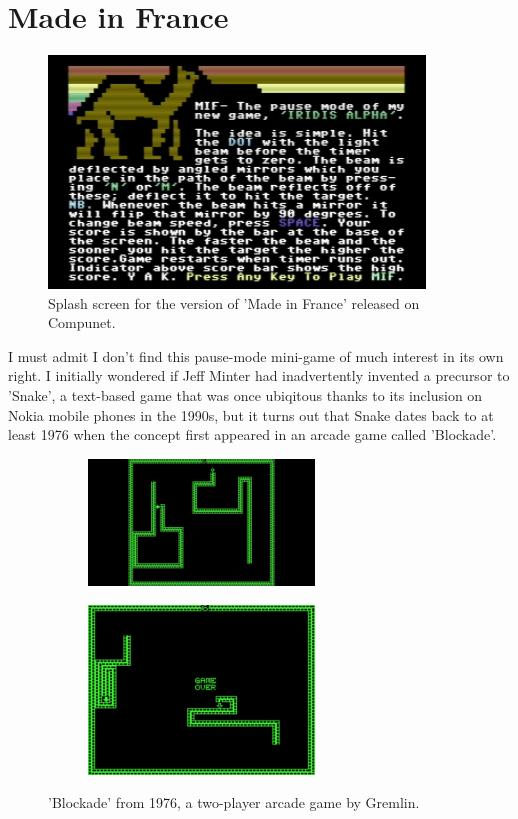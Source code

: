 \chapter{Made in France} 
\label{sec:mif}
\lstset{style=6502Style}
\begin{figure}[H]
    \centering
      \includegraphics[width=10cm]{src/mif/mif.png}%
\caption{Splash screen for the version of 'Made in France' released on Compunet.}
\end{figure}

I must admit I don't find this pause-mode mini-game of much interest in its own right. I initially
wondered if Jeff Minter had inadvertently invented a precursor to 'Snake', a text-based game that
was once ubiqitous thanks to its inclusion on Nokia mobile phones in the 1990s, but it turns out that
Snake dates back to at least 1976 when the concept first appeared in an arcade game called 'Blockade'.
\begin{figure}[H]
  {
    \setlength{\tabcolsep}{3.0pt}
    \setlength\cmidrulewidth{\heavyrulewidth} %
	\centering
	\begin{subfigure}{0.5\textwidth}
    \includegraphics[width=6cm]{src/mif/blockade.jpg}%
	\end{subfigure}
	\begin{subfigure}{0.5\textwidth}
      \includegraphics[width=6cm]{src/mif/blockade2.jpg}%
	\end{subfigure}
  }

\caption{'Blockade' from 1976, a two-player arcade game by Gremlin.}
\end{figure}

